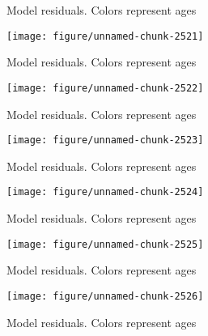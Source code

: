 \documentclass[a4paper]{article}\usepackage{graphicx, color}
\makeatletter
\def\maxwidth{ %
  \ifdim\Gin@nat@width>\linewidth
    \linewidth
  \else
    \Gin@nat@width
  \fi
}
\newenvironment{knitrout}{}{} %
\makeatother
\begin{document}
\begin{knitrout}
\begin{figure}[H]
\caption[Model residuals]{Model residuals. Colors represent ages\label{fig:unnamed-chunk-2520}}
\end{figure}
\begin{figure}[H]


{\centering \texttt{[image: figure/unnamed-chunk-2521]} 

}

\caption[Model residuals]{Model residuals. Colors represent ages\label{fig:unnamed-chunk-2521}}
\end{figure}
\begin{figure}[H]


{\centering \texttt{[image: figure/unnamed-chunk-2522]} 

}

\caption[Model residuals]{Model residuals. Colors represent ages\label{fig:unnamed-chunk-2522}}
\end{figure}
\begin{figure}[H]


{\centering \texttt{[image: figure/unnamed-chunk-2523]} 

}

\caption[Model residuals]{Model residuals. Colors represent ages\label{fig:unnamed-chunk-2523}}
\end{figure}
\begin{figure}[H]


{\centering \texttt{[image: figure/unnamed-chunk-2524]} 

}

\caption[Model residuals]{Model residuals. Colors represent ages\label{fig:unnamed-chunk-2524}}
\end{figure}
\begin{figure}[H]


{\centering \texttt{[image: figure/unnamed-chunk-2525]} 

}

\caption[Model residuals]{Model residuals. Colors represent ages\label{fig:unnamed-chunk-2525}}
\end{figure}
\begin{figure}[H]


{\centering \texttt{[image: figure/unnamed-chunk-2526]} 

}

\caption[Model residuals]{Model residuals. Colors represent ages\label{fig:unnamed-chunk-2526}}
\end{figure}
\begin{figure}[H]



\end{figure}
\end{knitrout}
\end{document}

